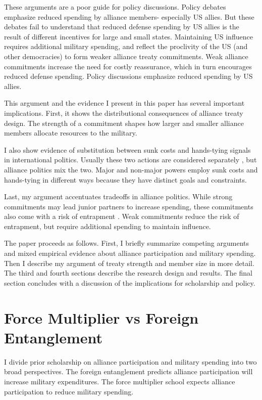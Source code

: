 \documentclass[12pt]{article}
\begin{document}
These arguments are a poor guide for policy discussions. 
Policy debates emphasize reduced spending by alliance members- especially US allies. 
But these debates fail to understand that reduced defense spending by US allies is the result of different incentives for large and small states. 
Maintaining US influence requires additional military spending, and reflect the proclivity of the US (and other democracies) to form weaker alliance treaty commitments. 
Weak alliance commitments increase the need for costly reassurance, which in turn encourages reduced defense spending. 
Policy discussions emphasize reduced spending by US allies.  


This argument and the evidence I present in this paper has several important implications. 
First, it shows the distributional consequences of alliance treaty design. 
The strength of a commitment shapes how larger and smaller alliance members allocate resources to the military. 


I also show evidence of substitution between sunk costs and hands-tying signals in international politics. 
Usually these two actions are considered separately \citep{Fearon1997, FuhrmannSechser2014}, but alliance politics mix the two. 
Major and non-major powers employ sunk costs and hands-tying in different ways because they have distinct goals and constraints. 


Last, my argument accentuates tradeoffs in alliance politics.
While strong commitments may lead junior partners to increase spending, these commitments also come with a risk of entrapment \citep{Benson2012}.
Weak commitments reduce the risk of entrapment, but require additional spending to maintain influence.


The paper proceeds as follows. 
First, I briefly summarize competing arguments and mixed empirical evidence about alliance participation and military spending. 
Then I describe my argument of treaty strength and member size in more detail. 
The third and fourth sections describe the research design and results. 
The final section concludes with a discussion of the implications for scholarship and policy.  


\section{Force Multiplier vs Foreign Entanglement}


I divide prior scholarship on alliance participation and military spending into two broad perspectives. 
The foreign entanglement predicts alliance participation will increase military expenditures.
The force multiplier school expects alliance participation to reduce military spending. 
\end{document}
